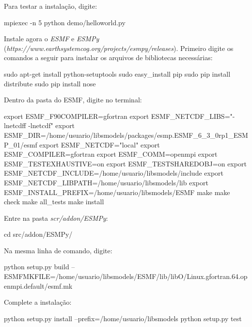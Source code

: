 \noindent Para testar a instalação, digite:
\bigskip

\begin{bashcode}
mpiexec -n 5 python demo/helloworld.py
\end{bashcode}
\bigskip

\noindent Instale agora o \textit{ESMF} e \textit{ESMPy} (\textcolor{bleu_cite}{\textit{https://www.earthsystemcog.org/projects/esmpy/releases}}). Primeiro digite os comandos a seguir para instalar os arquivos de bibliotecas necessárias:
\bigskip

\begin{bashcode}
sudo apt-get install python-setuptools
sudo easy_install pip
sudo pip install distribute
sudo pip install nose
\end{bashcode}
\bigskip

\noindent Dentro da pasta do ESMF, digite no terminal:
\bigskip

\begin{bashcode}[fontsize=\footnotesize]
export ESMF_F90COMPILER=gfortran
export ESMF_NETCDF_LIBS="-lnetcdff -lnetcdf"
export ESMF_DIR=/home/usuario/libsmodels/packages/esmp.ESMF_6_3_0rp1_ESMP_01/esmf
export ESMF_NETCDF="local"
export ESMF_COMPILER=gfortran
export ESMF_COMM=openmpi
export ESMF_TESTEXHAUSTIVE=on
export ESMF_TESTSHAREDOBJ=on
export ESMF_NETCDF_INCLUDE=/home/usuario/libsmodels/include
export ESMF_NETCDF_LIBPATH=/home/usuario/libsmodels/lib
export ESMF_INSTALL_PREFIX=/home/usuario/libsmodels/ESMF
make
make check
make all_tests
make install
\end{bashcode}
\bigskip

\noindent Entre na pasta \textit{scr/addon/ESMPy}:
\bigskip

\begin{bashcode}
cd src/addon/ESMPy/
\end{bashcode}
\bigskip

\noindent Na mesma linha de comando, digite:
\bigskip

\begin{bashcode}[fontsize=\footnotesize]
python setup.py build
--ESMFMKFILE=/home/usuario/libsmodels/ESMF/lib/libO/Linux.gfortran.64.openmpi.default/esmf.mk
\end{bashcode}
\bigskip

\noindent Complete a instalação:
\bigskip

\begin{bashcode}
python setup.py install --prefix=/home/usuario/libsmodels
python setup.py test
\end{bashcode}
\bigskip

